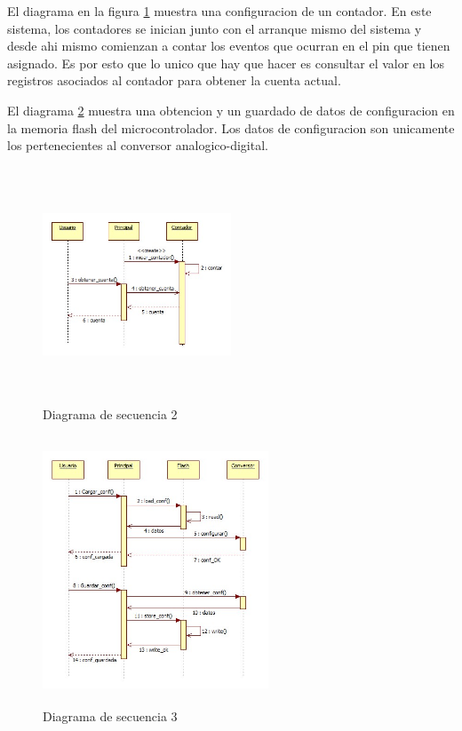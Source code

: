 \documentclass{article}
\theoremstyle{definition}
\theoremstyle{remark}
\begin{document}
El diagrama en la figura \ref{fig:secuencia2} muestra una configuracion de un contador. En este sistema, los contadores se inician junto con el arranque mismo del sistema y desde ahi mismo comienzan a contar los eventos que ocurran en el pin que tienen asignado. Es por esto que lo unico que hay que hacer es consultar el valor en los registros asociados al contador para obtener la cuenta actual.

El diagrama \ref{fig:secuencia3} muestra una obtencion y un guardado de datos de configuracion en la memoria flash del microcontrolador. Los datos de configuracion son unicamente los pertenecientes al conversor analogico-digital.

\begin{figure}[h]
  \centering
  \includegraphics[width=0.50\textwidth, height = 7cm]{Secuencia2}
  \caption{Diagrama de secuencia 2}\label{fig:secuencia2}
\end{figure}


\begin{figure}[H]
  \centering
  \includegraphics[width=0.60\textwidth, height = 8cm]{Secuencia3}
  \caption{Diagrama de secuencia 3}\label{fig:secuencia3}
\end{figure}
\end{document}
